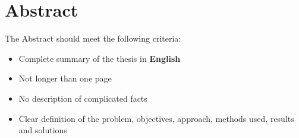 \chapter{Abstract}
The Abstract should meet the following criteria:
\begin{itemize}
	\item Complete summary of the thesis in \textbf{English}
	\item Not longer than one page
	\item No description of complicated facts
	\item Clear definition of the problem, objectives, approach, methods used, results and solutions
\end{itemize}